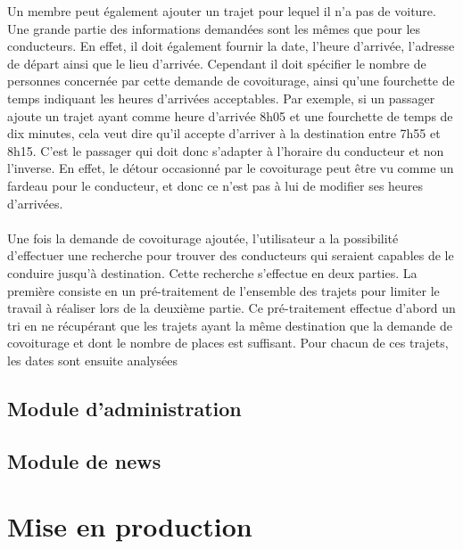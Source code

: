 \documentclass[12pt, a4paper, oneside]{article}
\begin{document}
    \indent Un membre peut également ajouter un trajet pour lequel il n'a pas de voiture. Une grande partie des informations demandées sont les mêmes que pour les conducteurs. En effet, il doit également fournir la date, l'heure d'arrivée, l'adresse de départ ainsi que le lieu d'arrivée. Cependant il doit spécifier le nombre de personnes concernée par cette demande de covoiturage, ainsi qu'une fourchette de temps indiquant les heures d'arrivées acceptables. Par exemple, si un passager ajoute un trajet ayant comme heure d'arrivée 8h05 et une fourchette de temps de dix minutes, cela veut dire qu'il accepte d'arriver à la destination entre 7h55 et 8h15. C'est le passager qui doit donc s'adapter à l'horaire du conducteur et non l'inverse. En effet, le détour occasionné par le covoiturage peut être vu comme un fardeau pour le conducteur, et donc ce n'est pas à lui de modifier ses heures d'arrivées.\\\\
    \indent Une fois la demande de covoiturage ajoutée, l'utilisateur a la possibilité d'effectuer une recherche pour trouver des conducteurs qui seraient capables de le conduire jusqu'à destination. Cette recherche s'effectue en deux parties. La première consiste en un pré-traitement de l'ensemble des trajets pour limiter le travail à réaliser lors de la deuxième partie. Ce pré-traitement effectue d'abord un tri en ne récupérant que les trajets ayant la même destination que la demande de covoiturage et dont le nombre de places est suffisant. Pour chacun de ces trajets, les dates sont ensuite analysées
\subsection{Module d'administration}
\subsection{Module de news}
\section{Mise en production}
\end{document}
